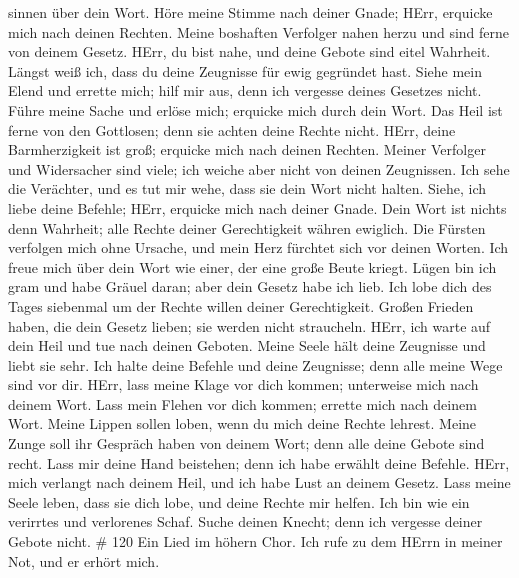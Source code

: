 sinnen über dein Wort.  Höre meine Stimme nach deiner
Gnade; HErr, erquicke mich nach deinen Rechten.  Meine
boshaften Verfolger nahen herzu und sind ferne von deinem Gesetz.
 HErr, du bist nahe, und deine Gebote sind eitel Wahrheit.
 Längst weiß ich, dass du deine Zeugnisse für ewig
gegründet hast.  Siehe mein Elend und errette mich; hilf
mir aus, denn ich vergesse deines Gesetzes nicht.  Führe
meine Sache und erlöse mich; erquicke mich durch dein Wort.
 Das Heil ist ferne von den Gottlosen; denn sie achten
deine Rechte nicht.  HErr, deine Barmherzigkeit ist groß;
erquicke mich nach deinen Rechten.  Meiner Verfolger und
Widersacher sind viele; ich weiche aber nicht von deinen Zeugnissen.
 Ich sehe die Verächter, und es tut mir wehe, dass sie
dein Wort nicht halten.  Siehe, ich liebe deine Befehle;
HErr, erquicke mich nach deiner Gnade.  Dein Wort ist
nichts denn Wahrheit; alle Rechte deiner Gerechtigkeit währen ewiglich.
 Die Fürsten verfolgen mich ohne Ursache, und mein Herz
fürchtet sich vor deinen Worten.  Ich freue mich über dein
Wort wie einer, der eine große Beute kriegt.  Lügen bin
ich gram und habe Gräuel daran; aber dein Gesetz habe ich lieb.
 Ich lobe dich des Tages siebenmal um der Rechte willen
deiner Gerechtigkeit.  Großen Frieden haben, die dein
Gesetz lieben; sie werden nicht straucheln.  HErr, ich
warte auf dein Heil und tue nach deinen Geboten.  Meine
Seele hält deine Zeugnisse und liebt sie sehr.  Ich halte
deine Befehle und deine Zeugnisse; denn alle meine Wege sind vor dir.
 HErr, lass meine Klage vor dich kommen; unterweise mich
nach deinem Wort.  Lass mein Flehen vor dich kommen;
errette mich nach deinem Wort.  Meine Lippen sollen loben,
wenn du mich deine Rechte lehrest.  Meine Zunge soll ihr
Gespräch haben von deinem Wort; denn alle deine Gebote sind recht.
 Lass mir deine Hand beistehen; denn ich habe erwählt
deine Befehle.  HErr, mich verlangt nach deinem Heil, und
ich habe Lust an deinem Gesetz.  Lass meine Seele leben,
dass sie dich lobe, und deine Rechte mir helfen.  Ich bin
wie ein verirrtes und verlorenes Schaf. Suche deinen Knecht; denn ich
vergesse deiner Gebote nicht. \# 120  Ein Lied im höhern
Chor. Ich rufe zu dem HErrn in meiner Not, und er erhört mich.

